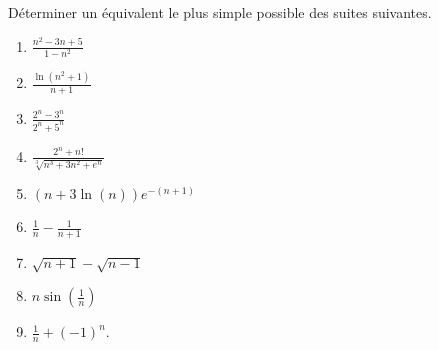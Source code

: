 \documentclass[solutions]{exercices}
\begin{document}

\begin{exercice}[\di]
	Déterminer un équivalent le plus simple possible des suites suivantes.
	\begin{multicols}{3}
		\newcommand{\elabel}{${\Alph*}_n  =$}
		\begin{enumerate}[label=\elabel]
			\item ${\displaystyle \frac{n^2-3n+5}{1-n^2} }$
			\item ${\displaystyle  \frac{\ln(n^2+1)}{n + 1} }$
			\item ${\displaystyle   \frac{2^n - 3^n}{2^n + 5^n} }$
			\item ${\displaystyle \frac{2^n + n!}{\sqrt[3]{n^3 + 3n^2 + e^n}} }$
			\item ${\displaystyle   (n + 3\ln(n))e^{-(n+1)}}$
			\item ${\displaystyle   \frac{1}{n} - \frac{1}{n+1} }$
			\item ${\displaystyle   \sqrt{n+1} - \sqrt{n-1}}$
			\item ${\displaystyle   n \sin\left( \frac{1}{n} \right)}$
			\item ${\displaystyle   \frac{1}{n} + (-1)^n }$.
		\end{enumerate}
	\end{multicols}
\end{exercice}
\end{document}

